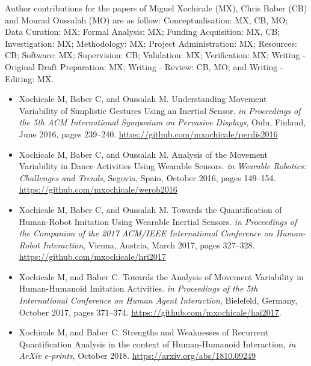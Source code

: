 Author contributions for the papers of 
Miguel Xochicale (MX), Chris Baber (CB) and Mourad Oussalah (MO) are as follow:
Conceptualisation: MX, CB, MO;
Data Curation: MX;
Formal Analysis: MX;
Funding Acquisition: MX, CB;
Investigation: MX;
Methodology: MX;
Project Administration: MX;
Resources: CB;
Software: MX;
Supervision: CB;
Validation: MX;
Verification: MX;
Writing - Original Draft Preparation: MX;
Writing - Review: CB, MO; and 
Writing - Editing: MX.

\begin{itemize}
\item Xochicale M, Baber C, and Oussalah M. 
	Understanding Movement Variability of Simplistic Gestures Using 
	an Inertial Sensor. 
	\textit{in Proceedings of the 5th ACM International 
	Symposium on Pervasive Displays}, 
	Oulu, Finland, June 2016, 
	pages 239--240.
	\url{https://github.com/mxochicale/perdis2016}

\item Xochicale M, Baber C, and Oussalah M.
	Analysis of the Movement Variability in Dance Activities Using 
	Wearable Sensors.
	\textit{in Wearable Robotics: Challenges and Trends},
	Segovia, Spain, October 2016,
	pages 149--154. \\
	\url{https://github.com/mxochicale/werob2016}

\item Xochicale M, Baber C, and Oussalah M.
	Towards the Quantification of Human-Robot Imitation Using Wearable 
	Inertial Sensors.
	\textit{in Proceedings of the Companion of the 2017 
	ACM/IEEE International Conference on Human-Robot Interaction},
	Vienna, Austria, March 2017,
	pages 327--328. \\
	\url{https://github.com/mxochicale/hri2017}

\item Xochicale M, and Baber C.
	Towards the Analysis of Movement Variability in Human-Humanoid 
	Imitation Activities.
	\textit{in Proceedings of the 5th International 
	Conference on Human Agent Interaction},
	Bielefeld, Germany, October 2017,
	pages 371--374.
	\url{https://github.com/mxochicale/hai2017}.

\item Xochicale M, and Baber C.
	Strengths and Weaknesses of Recurrent Quantification Analysis in 
	the context of Human-Humanoid Interaction,
	\textit{in ArXiv e-prints}, 
	October 2018.
	\url{https://arxiv.org/abs/1810.09249}
\end{itemize}

